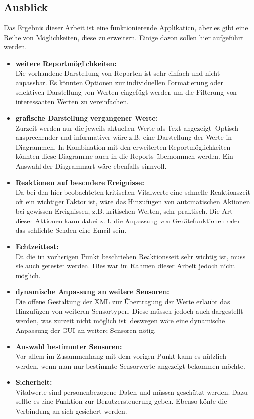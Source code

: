\subsection{Ausblick}
\label{subsec:Ausblick}
Das Ergebnis dieser Arbeit ist eine funktionierende Applikation, aber es gibt eine Reihe von Möglichkeiten, diese zu erweitern. Einige davon sollen hier aufgeführt werden.

\begin{itemize}
	\item \textbf{weitere Reportmöglichkeiten:} \\
	Die vorhandene Darstellung von Reporten ist sehr einfach und nicht anpassbar. Es könnten Optionen zur individuellen Formatierung oder selektiven Darstellung von Werten eingefügt werden um die Filterung von interessanten Werten zu vereinfachen.
	\item \textbf{grafische Darstellung vergangener Werte:} \\
	Zurzeit werden nur die jeweils aktuellen Werte als Text angezeigt. Optisch ansprechender und informativer wäre z.B. eine Darstellung der Werte in Diagrammen. In Kombination mit den erweiterten Reportmöglichkeiten könnten diese Diagramme auch in die Reports übernommen werden. Ein Auswahl der Diagrammart wäre ebenfalls sinnvoll.
	\item \textbf{Reaktionen auf besondere Ereignisse:} \\
	Da bei den hier beobachteten kritischen Vitalwerte eine schnelle Reaktionszeit oft ein wichtiger Faktor ist, wäre das Hinzufügen von automatischen Aktionen bei gewissen Ereignissen, z.B. kritischen Werten, sehr praktisch. Die Art dieser Aktionen kann dabei z.B. die Anpassung von Gerätefunktionen oder das schlichte Senden eine Email sein.
	\item \textbf{Echtzeittest:} \\
	Da die im vorherigen Punkt beschrieben Reaktionszeit sehr wichtig ist, muss sie auch getestet werden. Dies war im Rahmen dieser Arbeit jedoch nicht möglich. 
	\item \textbf{dynamische Anpassung an weitere Sensoren:} \\
	Die offene Gestaltung der XML zur Übertragung der Werte erlaubt das Hinzufügen von weiteren Sensortypen. Diese müssen jedoch auch dargestellt werden, was zurzeit nicht möglich ist, deswegen wäre eine dynamische Anpassung der GUI an weitere Sensoren nötig. 
	\item \textbf{Auswahl bestimmter Sensoren:} \\
	Vor allem im Zusammenhang mit dem vorigen Punkt kann es nützlich werden, wenn man nur bestimmte Sensorwerte angezeigt bekommen möchte.
	\item \textbf{Sicherheit:} \\
	Vitalwerte sind personenbezogene Daten und müssen geschützt werden. Dazu sollte es eine Funktion zur Benutzersteuerung geben. Ebenso könte die Verbindung an sich gesichert werden.
\end{itemize}

